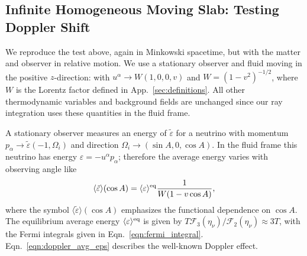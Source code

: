 \documentclass[aps,floatfix,prd,superscriptaddress,twocolumn]{revtex4-1}
\begin{document}
\subsection{Infinite Homogeneous Moving Slab:
  Testing Doppler Shift}
\label{ssec:test_doppler}
We reproduce the test above, again in Minkowski spacetime,
but with the matter and observer in relative motion.
We use a stationary observer
and fluid moving in the positive $z$-direction:
with $u^\alpha \rightarrow W(1,0,0,v)$ and $W=(1-v^2)^{-1/2}$,
where $W$ is the Lorentz factor defined in App.~\ref{sec:definitions}.
All other thermodynamic variables and background fields are unchanged
since our ray integration uses these quantities in the fluid frame.

A stationary observer measures an energy of $\tilde{\varepsilon}$
for a neutrino with momentum
$p_\alpha \rightarrow \tilde{\varepsilon}(-1,\Omega_i)$
and direction $\Omega_i \rightarrow (\sin A, 0, \cos A)$.
In the fluid frame this neutrino has energy $\varepsilon=-u^\alpha p_\alpha$;
therefore the average energy varies with observing angle like
\begin{equation}
  \label{eqn:doppler_avg_eps}
  \langle \tilde{\varepsilon} \rangle(\cos A) =
  \langle \varepsilon \rangle^{\rm eq} \frac{1}{W(1-v \cos A)},
\end{equation}
where the symbol $\langle \tilde{\varepsilon} \rangle(\cos A)$ emphasizes
the functional dependence on $\cos A$.
The equilibrium average energy $\langle \varepsilon \rangle^{\rm eq}$
is given by $T \mathscr{F}_3(\eta_\nu)/\mathscr{F}_2(\eta_\nu)\approx 3T$,
with the Fermi integrals given in Eqn.~\ref{eqn:fermi_integral}.
Eqn.~\ref{eqn:doppler_avg_eps} describes the well-known Doppler effect.
\end{document}
